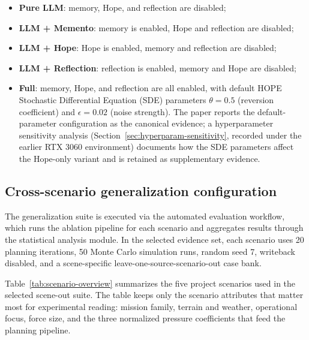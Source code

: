 \begin{itemize}
\item \textbf{Pure LLM}: memory, Hope, and reflection are disabled;
\item \textbf{LLM + Memento}: memory is enabled, Hope and reflection are disabled;
\item \textbf{LLM + Hope}: Hope is enabled, memory and reflection are disabled;
\item \textbf{LLM + Reflection}: reflection is enabled, memory and Hope are disabled;
\item \textbf{Full}: memory, Hope, and reflection are all enabled, with default HOPE Stochastic Differential Equation (SDE) parameters $\theta=0.5$ (reversion coefficient) and $\epsilon=0.02$ (noise strength). The paper reports the default-parameter configuration as the canonical evidence; a hyperparameter sensitivity analysis (Section~\ref{sec:hyperparam-sensitivity}, recorded under the earlier RTX 3060 environment) documents how the SDE parameters affect the Hope-only variant and is retained as supplementary evidence.
\end{itemize}

\subsection{Cross-scenario generalization configuration}

The generalization suite is executed via the automated evaluation workflow, which runs the ablation pipeline for each scenario and aggregates results through the statistical analysis module. In the selected evidence set, each scenario uses 20 planning iterations, 50 Monte Carlo simulation runs, random seed 7, writeback disabled, and a scene-specific leave-one-source-scenario-out case bank.

Table~\ref{tab:scenario-overview} summarizes the five project scenarios used in the selected scene-out suite. The table keeps only the scenario attributes that matter most for experimental reading: mission family, terrain and weather, operational focus, force size, and the three normalized pressure coefficients that feed the planning pipeline.

